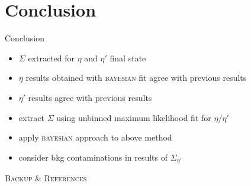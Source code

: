 \documentclass[11pt,aspectratio=169,dvipsnames]{beamer}
\newcommand{\thecolor}{black!70!blue}
\begin{document}
	
	
	
	\section{Conclusion}
	\begin{frame}{Conclusion}
		\begin{minipage}{.49\linewidth}
			\begin{tcolorbox}[colback=blue!5,colframe=\thecolor,title={Summary}]
				\begin{itemize}
					\item $\Sigma$ extracted for $\eta$ and $\eta'$ final state
					\item $\eta$ results obtained with \textsc{bayesian} fit agree with previous results 
					\item $\eta'$ results agree with previous results
				\end{itemize}
			\end{tcolorbox}
		\end{minipage}
		\begin{minipage}{.49\linewidth}
			\begin{tcolorbox}[colback=blue!5,colframe=\thecolor,title={Outlook}]
				\begin{itemize}
					
					\item extract $\Sigma$ using unbinned maximum likelihood fit for $\eta/\eta'$
					\item apply \textsc{bayesian} approach to above method
					\item consider bkg contaminations in results of $\Sigma_{\eta'}$
					
				\end{itemize}
			\end{tcolorbox}
		\end{minipage}
	\end{frame}
	
	\appendix
	\begin{frame}
		\centering
		\LARGE
		\color{\thecolor}\textsc{Backup \& References}
	\end{frame}
	
\end{document}
